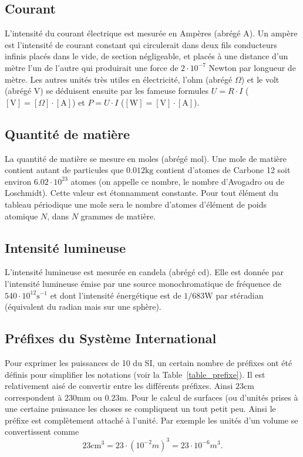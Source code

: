 \documentclass[a4paper,12pt]{book}
\newcommand{\cm}{\mathrm{cm}}
\newcommand{\mm}{\mathrm{mm}}
\newcommand{\cd}{\mathrm{cd}}
\newcommand{\mol}{\mathrm{mol}}
\newcommand{\m}{\mathrm{m}}
\newcommand{\s}{\mathrm{s}}
\newcommand{\kg}{\mathrm{kg}}
\newcommand{\A}{\mathrm{A}}
\newcommand{\V}{\mathrm{V}}
\newcommand{\W}{\mathrm{W}}
\begin{document}
\subsection{Courant}

L'intensité du courant électrique est mesurée en Ampères (abrégé $\A$). Un ampère est l'intensité de courant constant qui circulerait 
dans deux fils conducteurs infinis placés dans le vide, de section négligeable, et placés à une distance d'un mètre l'un de l'autre 
qui produirait une force de $2\cdot 10^{-7}$ Newton par longueur de mètre. Les autres unités très utiles en électricité, l'ohm (abrégé $\Omega$) et 
le volt (abrégé $\V$) se déduisent ensuite par les fameuse formules $U=R\cdot I$ ($[\V]=[\Omega]\cdot [\A]$) et $P=U\cdot I$ ($[\W]=[\V]\cdot [\A]$).

\subsection{Quantité de matière}

La quantité de matière se mesure en moles (abrégé $\mol$). Une mole de matière contient autant de particules que 
$0.012\kg$ contient d'atomes de Carbone 12 soit environ $6.02\cdot 10^{23}$ atomes (on appelle ce nombre, le nombre d'Avogadro ou de Loschmidt). 
Cette valeur est étonnamment constante. Pour
tout élément du tableau périodique une mole sera le nombre d'atomes d'élément de poids atomique $N$, dans $N$ grammes de matière.

\subsection{Intensité lumineuse}

L'intensité lumineuse est mesurée en candela (abrégé $\cd$). Elle est donnée par l'intensité lumineuse émise par
une source monochromatique de fréquence de $540\cdot 10^{12}\s^{-1}$ et dont l'intensité énergétique est de 
$1/683 \W$ par stéradian (équivalent du radian mais sur une sphère).

\subsection{Préfixes du Système International}

Pour exprimer les puissances de 10 du SI, un certain nombre de préfixes ont été définis pour simplifier 
les notations (voir la Table~\ref{table_prefixe}). Il est relativement aisé de convertir entre les différents préfixes.
Ainsi $23\cm$ correspondent à $230\mm$ ou $0.23\m$. Pour le calcul de surfaces (ou d'unités prises à une certaine puissance les choses
se compliquent un tout petit peu. Ainsi le préfixe est complètement attaché à l'unité. Par exemple les unités d'un volume
se convertissent comme
\begin{equation}
 23\cm^3=23\cdot(10^{-2} m)^3=23\cdot 10^{-6}m^3.
\end{equation}
\end{document}
